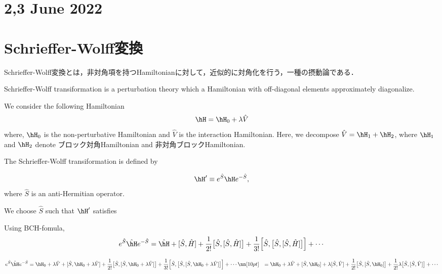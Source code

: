 \section*{2,3 June 2022}
\section{Schrieffer-Wolff変換}
Schrieffer-Wolff変換とは，非対角項を持つHamiltonianに対して，近似的に対角化を行う，一種の摂動論である．

Schrieffer-Wolff transiformation is a perturbation theory which a Hamiltonian with off-diagonal elements approximately diagonalize.

We consider the following Hamiltonian
\begin{equation}
    \hH = \hH_0 + \lambda\hat{V}
\end{equation}
where, $\hH_0$ is the non-perturbative Hamiltonian and $\hat{V}$ is the interaction Hamiltonian. Here, we decompose $\hat{V}=\hH_1 + \hH_2$, where $\hH_1$ and $\hH_2$ denote ブロック対角Hamiltonian and  非対角ブロックHamiltonian.


The Schrieffer-Wolff transiformation is defined by 

\begin{equation}
    \hH^{\prime}\equiv e^{\hat{S}}\hH e^{-\hat{S}},
\end{equation}
where $\hat{S}$ is an anti-Hermitian operator. 

We choose $\hat{S}$ such that $\hH^{\prime}$ satisfies

Using BCH-fomula, 
\begin{equation}
    e^{\hat{S}}\hat{\hH}e^{-\hat{S}}
    =\hat{\hH}+[\hat{S}, \hat{H}]
    +\frac{1}{2!}\bigl[
    \hat{S}, [\hat{S}, \hat{H}]
    \bigr]
    +\frac{1}{3!}
    \Bigl[\hat{S},
    \bigl[
    \hat{S}, [\hat{S}, \hat{H}]
    \bigr]
    \Bigr]
    +\cdots
\end{equation}

\begin{align}
    e^{\hat{S}}\hat{\hH}e^{-\hat{S}}
    &=\hH_0 + \lambda\hat{V}+[\hat{S}, \hH_0 + \lambda\hat{V}]
    +\frac{1}{2!}\bigl[
    \hat{S}, [\hat{S}, \hH_0 + \lambda\hat{V}]
    \bigr]
    +\frac{1}{3!}
    \Bigl[\hat{S},
    \bigl[
    \hat{S}, [\hat{S}, \hH_0 + \lambda\hat{V}]
    \bigr]
    \Bigr]
    +\cdots\nn[10pt]
    &=\hH_0 + \lambda\hat{V}+[\hat{S}, \hH_0] +
    \lambda[\hat{S}, \hat{V}]
    +\frac{1}{2!}\bigl[
    \hat{S}, [\hat{S}, \hH_0]
    \bigr]
    +\frac{1}{2!}\lambda\bigl[
    \hat{S}, [\hat{S}, \hat{V}]
    \bigr]
    +\cdots
\end{align}

